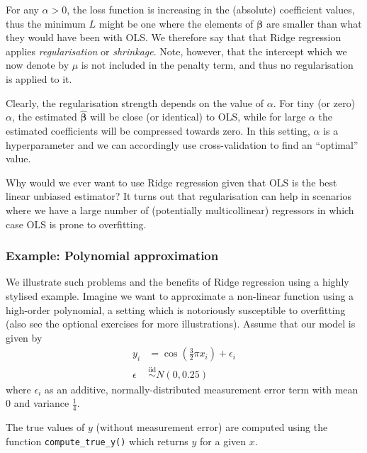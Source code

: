 \documentclass{scrartcl}
\begin{document}
For any \(\alpha > 0\), the loss function is increasing in the
(absolute) coefficient values, thus the minimum \(L\) might be one where
the elements of \(\bm\beta\) are smaller than what they would have
been with OLS. We therefore say that that Ridge regression applies
\emph{regularisation} or \emph{shrinkage}. Note, however, that the
intercept which we now denote by \(\mu\) is not included in the penalty
term, and thus no regularisation is applied to it.

Clearly, the regularisation strength depends on the value of \(\alpha\).
For tiny (or zero) \(\alpha\), the estimated
\(\widehat{\bm\beta}\) will be close (or identical) to OLS, while
for large \(\alpha\) the estimated coefficients will be compressed
towards zero. In this setting, \(\alpha\) is a hyperparameter and we can
accordingly use cross-validation to find an ``optimal'' value.

Why would we ever want to use Ridge regression given that OLS is the
best linear unbiased estimator? It turns out that regularisation can
help in scenarios where we have a large number of (potentially
multicollinear) regressors in which case OLS is prone to overfitting.

    \hypertarget{example-polynomial-approximation}{%
\vspace{1em}\subsubsection{Example: Polynomial
approximation}\label{example-polynomial-approximation}}

We illustrate such problems and the benefits of Ridge regression using a
highly stylised example. Imagine we want to approximate a non-linear
function using a high-order polynomial, a setting which is notoriously
susceptible to overfitting (also see the optional exercises for more
illustrations). Assume that our model is given by \[
\begin{aligned}
y_i &= \cos\left( \frac{3}{2}\pi x_i \right) + \epsilon_i \\
    \epsilon &\stackrel{\text{iid}}{\sim} N(0, 0.25)
\end{aligned}
\] where \(\epsilon_i\) as an additive, normally-distributed measurement
error term with mean \(0\) and variance \(\frac{1}{4}\).

The true values of \(y\) (without measurement error) are computed using
the function \texttt{compute\_true\_y()} which returns \(y\) for a given
\(x\).
\end{document}
